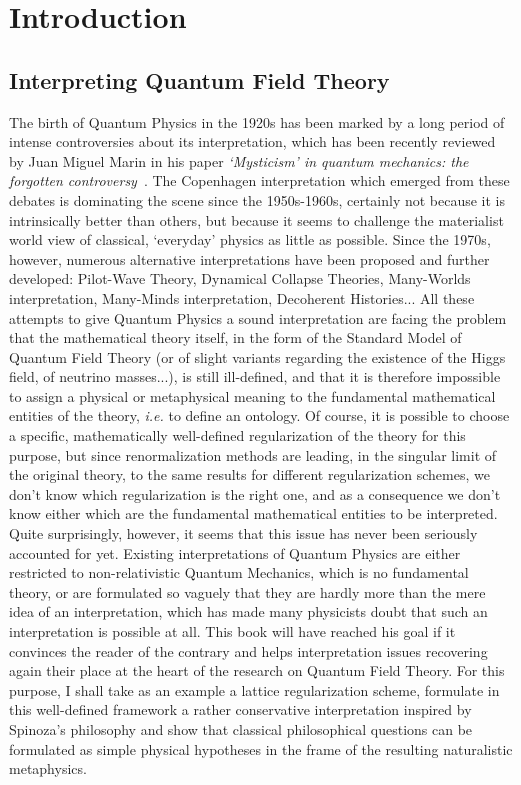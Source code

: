 \chapter*{Introduction}

\section*{Interpreting Quantum Field Theory}

The birth of Quantum Physics in the 1920s has been marked by a long period of intense controversies about its interpretation, which has been recently reviewed by Juan Miguel Marin in his paper \textit{‘Mysticism’ in quantum mechanics: the forgotten controversy}~\cite{Marin2009}.
The Copenhagen interpretation which emerged from these debates is dominating the scene since the 1950s-1960s, certainly not because it is intrinsically better than others, but because it seems to challenge the materialist world view of classical, `everyday' physics as little as possible.
Since the 1970s, however, numerous alternative interpretations have been proposed and further developed: Pilot-Wave Theory, Dynamical Collapse Theories, Many-Worlds interpretation, Many-Minds interpretation, Decoherent Histories...
All these attempts to give Quantum Physics a sound interpretation are facing the problem that the mathematical theory itself, in the form of the Standard Model of Quantum Field Theory (or of slight variants regarding the existence of the Higgs field, of neutrino masses...), is still ill-defined, and that it is therefore impossible to assign a physical or metaphysical meaning to the fundamental mathematical entities of the theory, \textit{i.e.} to define an ontology.
Of course, it is possible to choose a specific, mathematically well-defined regularization of the theory for this purpose, but since renormalization methods are leading, in the singular limit of the original theory, to the same results for different regularization schemes, we don't know which regularization is the right one, and as a consequence we don't know either which are the fundamental mathematical entities to be interpreted.
Quite surprisingly, however, it seems that this issue has never been seriously accounted for yet.
Existing interpretations of Quantum Physics are either restricted to non-relativistic Quantum Mechanics, which is no fundamental theory, or are formulated so vaguely that they are hardly more than the mere idea of an interpretation, which has made many physicists doubt that such an interpretation is possible at all.
This book will have reached his goal if it convinces the reader of the contrary and helps interpretation issues recovering again their place at the heart of the research on Quantum Field Theory.
For this purpose, I shall take as an example a lattice regularization scheme, formulate in this well-defined framework a rather conservative interpretation inspired by Spinoza's philosophy and show that classical philosophical questions can be formulated as simple physical hypotheses in the frame of the resulting naturalistic metaphysics.

